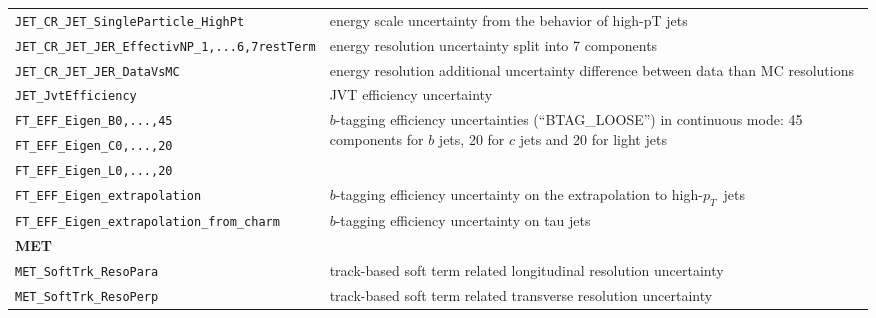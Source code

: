 \begin{table}
{\begin{tabular}{ll}
      \texttt{JET\_CR\_JET\_SingleParticle\_HighPt} & energy scale uncertainty from the behavior of high-pT jets \\%
      \texttt{JET\_CR\_JET\_JER\_EffectivNP\_1,...6,7restTerm} & energy resolution uncertainty split into 7 components \\%
      \texttt{JET\_CR\_JET\_JER\_DataVsMC} & energy resolution additional uncertainty difference between data than MC resolutions \\%
      \texttt{JET\_JvtEfficiency} & JVT efficiency uncertainty \\%
      \texttt{FT\_EFF\_Eigen\_B0,...,45} & \multirow{3}{*}{\parbox{11cm}{$b$-tagging efficiency uncertainties (``BTAG\_LOOSE'') in continuous mode: 45 components for $b$ jets, 20 for $c$ jets and 20 for light jets}} \\%
      \texttt{FT\_EFF\_Eigen\_C0,...,20} &\\%
      \texttt{FT\_EFF\_Eigen\_L0,...,20} &\\%
      \texttt{FT\_EFF\_Eigen\_extrapolation} & $b$-tagging efficiency uncertainty on the extrapolation to high-$p_T$\ jets \\%
      \texttt{FT\_EFF\_Eigen\_extrapolation\_from\_charm} & $b$-tagging efficiency uncertainty on tau jets \\%
      {\bfseries MET}&\\
      \texttt{MET\_SoftTrk\_ResoPara} & track-based soft term related longitudinal resolution uncertainty \\%
      \texttt{MET\_SoftTrk\_ResoPerp} &  track-based soft term related transverse resolution uncertainty \\%

\end{tabular}}
\end{table}
